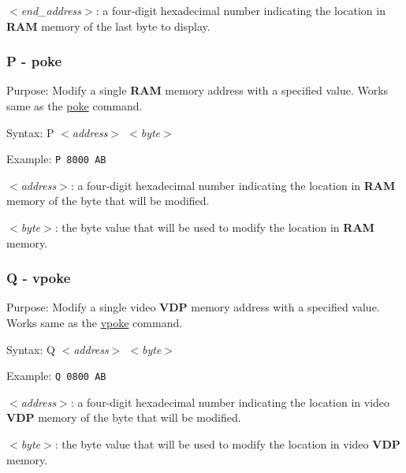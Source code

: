         \hspace{1cm}\textit{$<$end\_address$>$}: a four-digit hexadecimal
        number indicating the location in \textbf{RAM} memory of the last byte
        to display.

        \subsubsection{P - poke}

        Purpose: Modify a single \textbf{RAM} memory address with a specified
        value. Works same as the \hyperref[cmd:poke]{poke} command.

        Syntax: P \textit{$<$address$>$ $<$byte$>$}

        Example: \texttt{P 8000 AB}

        \hspace{1cm}\textit{$<$address$>$}: a four-digit hexadecimal number
        indicating the location in \textbf{RAM} memory of the byte that will be
        modified.

        \hspace{1cm}\textit{$<$byte$>$}: the byte value that will be used to
        modify the location in \textbf{RAM} memory.

        \subsubsection{Q - vpoke}

        Purpose: Modify a single video \textbf{VDP} memory address with a
        specified value. Works same as the \hyperref[cmd:vpoke]{vpoke} command.

        Syntax: Q \textit{$<$address$>$ $<$byte$>$}

        Example: \texttt{Q 0800 AB}

        \hspace{1cm}\textit{$<$address$>$}: a four-digit hexadecimal number
        indicating the location in video \textbf{VDP} memory of the byte that
        will be modified.

        \hspace{1cm}\textit{$<$byte$>$}: the byte value that will be used to
        modify the location in video \textbf{VDP} memory.

